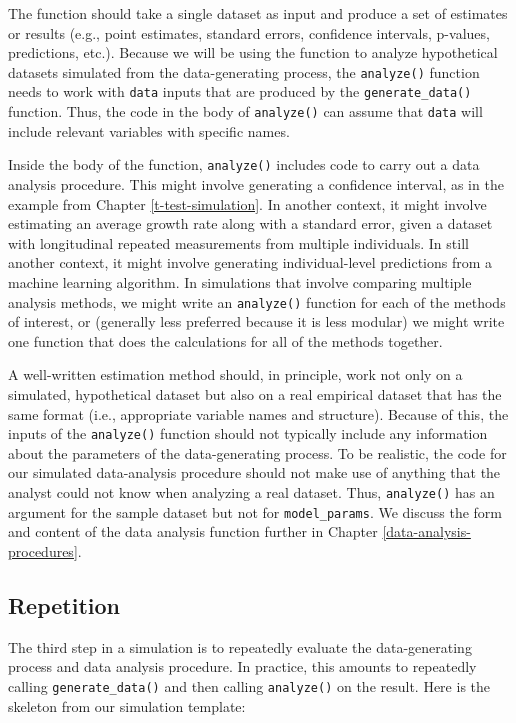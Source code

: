\documentclass[
]{book}
\begin{document}
The function should take a single dataset as input and produce a set of estimates or results (e.g., point estimates, standard errors, confidence intervals, p-values, predictions, etc.).
Because we will be using the function to analyze hypothetical datasets simulated from the data-generating process, the \texttt{analyze()} function needs to work with \texttt{data} inputs that are produced by the \texttt{generate\_data()} function.
Thus, the code in the body of \texttt{analyze()} can assume that \texttt{data} will include relevant variables with specific names.

Inside the body of the function, \texttt{analyze()} includes code to carry out a data analysis procedure.
This might involve generating a confidence interval, as in the example from Chapter \ref{t-test-simulation}.
In another context, it might involve estimating an average growth rate along with a standard error, given a dataset with longitudinal repeated measurements from multiple individuals.
In still another context, it might involve generating individual-level predictions from a machine learning algorithm.
In simulations that involve comparing multiple analysis methods, we might write an \texttt{analyze()} function for each of the methods of interest, or (generally less preferred because it is less modular) we might write one function that does the calculations for all of the methods together.

A well-written estimation method should, in principle, work not only on a simulated, hypothetical dataset but also on a real empirical dataset that has the same format (i.e., appropriate variable names and structure).
Because of this, the inputs of the \texttt{analyze()} function should not typically include any information about the parameters of the data-generating process.
To be realistic, the code for our simulated data-analysis procedure should not make use of anything that the analyst could not know when analyzing a real dataset.
Thus, \texttt{analyze()} has an argument for the sample dataset but not for \texttt{model\_params}.
We discuss the form and content of the data analysis function further in Chapter \ref{data-analysis-procedures}.

\subsection{Repetition}\label{repetition}

The third step in a simulation is to repeatedly evaluate the data-generating process and data analysis procedure.
In practice, this amounts to repeatedly calling \texttt{generate\_data()} and then calling \texttt{analyze()} on the result.
Here is the skeleton from our simulation template:
\end{document}
